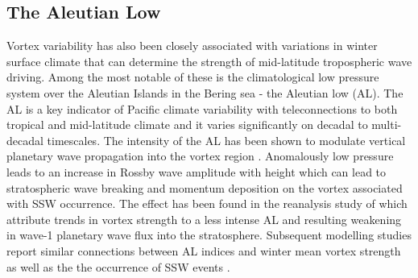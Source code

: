 \subsection{The Aleutian Low}
Vortex variability has also been closely associated with variations in winter surface climate that can determine the strength of mid-latitude tropospheric wave driving. Among the most notable of these is the climatological low pressure system over the Aleutian Islands in the Bering sea - the Aleutian low (AL). The AL is a key indicator of Pacific climate variability with teleconnections to both tropical and mid-latitude climate \citep{Nitta1989, Trenberth1994, Zhang1997} and it varies significantly on decadal to multi-decadal timescales. The intensity of the AL has been shown to modulate vertical planetary wave propagation into the vortex region \citep{Woo2015, Garfinkel2010, Manzini2006}. Anomalously low pressure leads to an increase in Rossby wave amplitude with height \citep{Plumb2003} which can lead to stratospheric wave breaking and momentum deposition on the vortex associated with SSW occurrence. The effect has been found in the reanalysis study of \cite{Hu2018} which attribute trends in vortex strength to a less intense AL and resulting weakening in wave-1 planetary wave flux into the stratosphere. Subsequent modelling studies report similar connections between AL indices and winter mean vortex strength as well as the the occurrence of SSW events \citep{krenWintertime2016}. 


